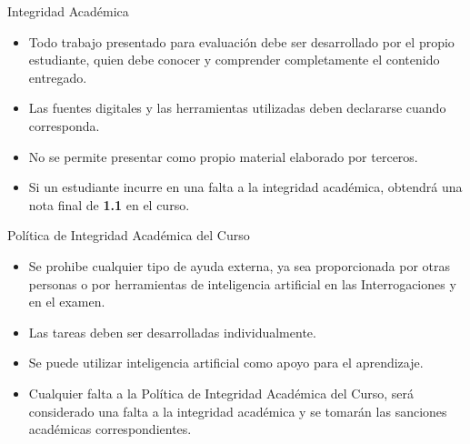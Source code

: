 \documentclass{beamer}
\begin{document}
    \begin{frame}[label=integridad-academica]{Integridad Académica}
        
        \begin{itemize}
            \item Todo trabajo presentado para evaluación debe ser desarrollado por
            el propio estudiante, quien debe conocer y comprender completamente
            el contenido entregado.
            \item Las fuentes digitales y las herramientas utilizadas deben declararse
            cuando corresponda.
            \item No se permite presentar como propio material elaborado por terceros.
            \item Si un estudiante incurre en una falta a la integridad académica, 
            obtendrá una nota final de \textbf{1.1} en el curso.
        \end{itemize}
        
    \end{frame}

    \begin{frame}{Política de Integridad Académica del Curso}
        
        \begin{itemize}
            \item Se prohibe cualquier tipo de ayuda externa, ya sea proporcionada
            por otras personas o por herramientas de inteligencia artificial en las Interrogaciones
            y en el examen.
            \item Las tareas deben ser desarrolladas individualmente.
            \item Se puede utilizar inteligencia artificial como apoyo para el aprendizaje.
            \item Cualquier falta a la Política de Integridad Académica del Curso, será considerado una falta a 
            la integridad académica y se tomarán las sanciones académicas correspondientes.
        \end{itemize}
        
    \end{frame}
\end{document}

